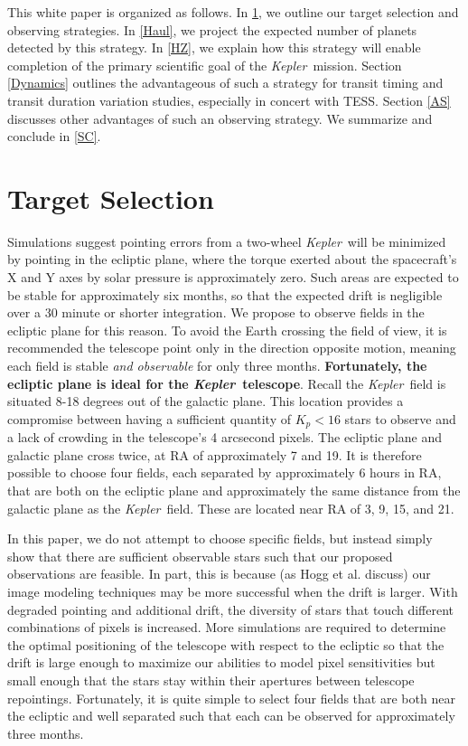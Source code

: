 \documentclass[12pt, preprint]{aastex}
\newcommand{\observatory}[1]{\textsl{#1}}
\newcommand{\kepler}{\observatory{Kepler}}
\newcommand{\Kepler}{\kepler}
\begin{document}
This white paper is organized as follows. 
In \textsection\ref{Targets}, we outline our target selection and observing 
 strategies. 
In \textsection\ref{Haul}, we project the expected number of planets detected 
 by this strategy. 
In \textsection\ref{HZ}, we explain how this strategy will enable completion of 
 the primary scientific goal of the \Kepler\ mission.
Section \ref{Dynamics} outlines the advantageous of such a strategy for
 transit timing and transit duration variation studies, especially in concert
 with TESS. 
Section \ref{AS} discusses other advantages of such an observing strategy. 
We summarize and conclude in \textsection\ref{SC}. 

\section{Target Selection}
\label{Targets}
Simulations suggest pointing errors from a two-wheel \Kepler\ will be 
 minimized by pointing in the ecliptic plane, where the torque exerted about 
 the spacecraft's X and Y axes by solar pressure is approximately zero. 
Such areas are expected to be stable for approximately six months, so that the 
 expected drift is negligible over a 30 minute or shorter integration.
We propose to observe fields in the ecliptic plane for this reason. 
To avoid the Earth crossing the field of view, it is recommended the telescope
 point only in the direction opposite motion, meaning each field is stable 
 \emph{and observable} for only three months.
\textbf{Fortunately, the ecliptic plane is ideal for the \Kepler\ telescope}.
Recall the \Kepler\ field is situated 8-18 degrees out of the galactic 
 plane\citep{Gilliland11}.
This location provides a compromise between having a sufficient quantity of 
 $K_p < 16$ stars to observe and a lack of crowding in the telescope's 4 
 arcsecond pixels. 
The ecliptic plane and galactic plane cross twice, at RA of approximately
 7 and 19. 
It is therefore possible to choose four fields, each separated by
 approximately 6 hours in RA, that are both on the ecliptic plane and
 approximately the same distance from the galactic plane as the \Kepler\
 field. 
These are located near RA of 3, 9, 15, and 21. 

In this paper, we do not attempt to choose specific fields, but instead
 simply show that there are sufficient observable stars such that our proposed
 observations are feasible.
In part, this is because (as Hogg et al. discuss) our image modeling techniques
 may be more successful when the drift is larger. 
With degraded pointing and additional drift, the diversity of stars that touch
 different combinations of pixels is increased. 
More simulations are required to determine the optimal positioning of the 
 telescope with respect to the ecliptic so that the drift is large enough 
 to maximize our abilities to model pixel sensitivities but small enough 
 that the stars stay within their apertures between telescope repointings.
Fortunately, it is quite simple to select four fields that are both near the 
 ecliptic and well separated such that each can be observed for approximately
 three months.
\end{document}
